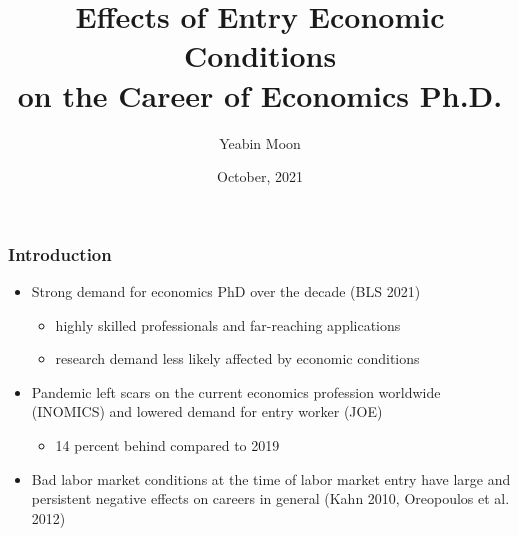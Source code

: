 \documentclass[11pt]{beamer}
\begin{document}
	\author{Yeabin Moon}
	\title{Effects of Entry Economic Conditions\\ on the Career of Economics Ph.D.}
	\date{October, 2021}
	
			\maketitle
	
	
	\begin{frame}
		\frametitle{Introduction}
		\begin{itemize}
			\begin{savequote}[45mm]
				---When shall we three meet again
				in thunder, lightning, or in rain?
				---When the hurlyburly’s done,
				when the battle’s lost and won.
				Cookies! Give me some cookies!
			\end{savequote}
			There is no unemployment among Ph.D.s in economics
			\item Strong demand for economics PhD over the decade (BLS 2021)
				\begin{itemize}
					\item highly skilled professionals and far-reaching applications
					\item research demand less likely affected by economic conditions   
				\end{itemize}
 	\vspace{1mm}
			\item Pandemic left scars on the current economics profession worldwide (INOMICS) and  lowered demand for entry worker (JOE)
					\begin{itemize}
						\item 14 percent behind compared to 2019
					\end{itemize}
	\vspace{1mm}
			\item Bad labor market conditions at the time of labor market entry have large and persistent negative effects on careers in general (Kahn 2010, Oreopoulos et al. 2012)

\end{itemize}
\end{frame}
\end{document}
